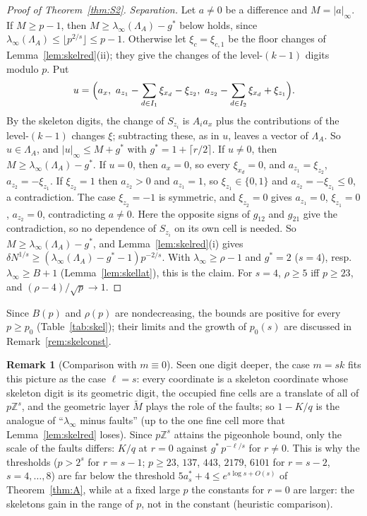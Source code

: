 \documentclass[11pt]{amsart}
\theoremstyle{definition}
\newtheorem{remark}[theorem]{Remark}
\theoremstyle{plain}
\newcommand{\Z}{\mathbb{Z}}
\begin{document}
\begin{proof}[Proof of Theorem~\ref{thm:S2}]
\emph{Separation.} Let $a\ne0$ be a difference and $M=|a|_\infty$. If $M\ge p-1$, then $M\ge\lambda_\infty(\Lambda_A)-g^*$ below holds, since $\lambda_\infty(\Lambda_A)\le\lfloor p^{2/s}\rfloor\le p-1$. Otherwise let $\xi_c=\xi_{c,1}$ be the floor changes of Lemma~\ref{lem:skelred}(ii); they give the changes of the level-$(k-1)$ digits modulo $p$. Put
\[
u=\Bigl(a_x,\ a_{z_1}-\sum_{d\in I_1}\xi_{x_d}-\xi_{z_2},\ a_{z_2}-\sum_{d\in I_2}\xi_{x_d}+\xi_{z_1}\Bigr).
\]
By the skeleton digits, the change of $S_{z_i}$ is $A_ia_x$ plus the contributions of the level-$(k-1)$ changes $\xi$; subtracting these, as in $u$, leaves a vector of $\Lambda_A$. So $u\in\Lambda_A$, and $|u|_\infty\le M+g^*$ with $g^*=1+\lceil r/2\rceil$. If $u\ne0$, then $M\ge\lambda_\infty(\Lambda_A)-g^*$. If $u=0$, then $a_x=0$, so every $\xi_{x_d}=0$, and $a_{z_1}=\xi_{z_2}$, $a_{z_2}=-\xi_{z_1}$. If $\xi_{z_2}=1$ then $a_{z_2}>0$ and $a_{z_1}=1$, so $\xi_{z_1}\in\{0,1\}$ and $a_{z_2}=-\xi_{z_1}\le0$, a contradiction. The case $\xi_{z_2}=-1$ is symmetric, and $\xi_{z_2}=0$ gives $a_{z_1}=0$, $\xi_{z_1}=0$, $a_{z_2}=0$, contradicting $a\ne0$. Here the opposite signs of $g_{12}$ and $g_{21}$ give the contradiction, so no dependence of $S_{z_i}$ on its own cell is needed. So $M\ge\lambda_\infty(\Lambda_A)-g^*$, and Lemma~\ref{lem:skelred}(i) gives $\delta N^{1/s}\ge(\lambda_\infty(\Lambda_A)-g^*-1)p^{-2/s}$. With $\lambda_\infty\ge\rho-1$ and $g^*=2$ ($s=4$), resp. $\lambda_\infty\ge B+1$ (Lemma~\ref{lem:skellat}), this is the claim. For $s=4$, $\rho\ge5$ iff $p\ge23$, and $(\rho-4)/\sqrt p\to1$.
\end{proof}

Since $B(p)$ and $\rho(p)$ are nondecreasing, the bounds are positive for every $p\ge p_0$ (Table~\ref{tab:skel}); their limits and the growth of $p_0(s)$ are discussed in Remark~\ref{rem:skelconst}.

\begin{remark}[Comparison with $m\equiv0$]\label{rem:skelr0}
Seen one digit deeper, the case $m=sk$ fits this picture as the case $\ell=s$: every coordinate is a skeleton coordinate whose skeleton digit is its geometric digit, the occupied fine cells are a translate of all of $p\Z^s$, and the geometric layer $\tilde M$ plays the role of the faults; so $1-K/q$ is the analogue of ``$\lambda_\infty$ minus faults'' (up to the one fine cell more that Lemma~\ref{lem:skelred} loses). Since $p\Z^s$ attains the pigeonhole bound, only the scale of the faults differs: $K/q$ at $r=0$ against $g^*\,p^{-\ell/s}$ for $r\ne0$. This is why the thresholds ($p>2^s$ for $r=s-1$; $p\ge23$, $137$, $443$, $2179$, $6101$ for $r=s-2$, $s=4,\dots,8$) are far below the threshold $5a^*_s+4\le e^{s\log s+O(s)}$ of Theorem~\ref{thm:A}, while at a fixed large $p$ the constants for $r=0$ are larger: the skeletons gain in the range of $p$, not in the constant (heuristic comparison).
\end{remark}
\end{document}
